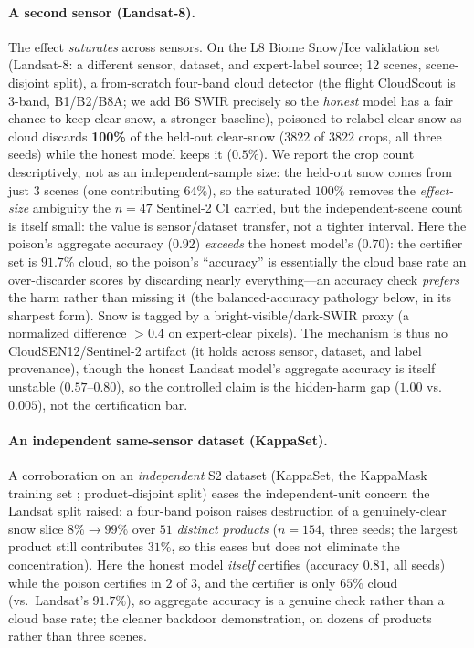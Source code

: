 \documentclass[conference]{IEEEtran}
\begin{document}
\paragraph{A second sensor (Landsat-8).} The effect \emph{saturates} across sensors. On the L8 Biome Snow/Ice validation set \cite{foga2017}
(Landsat-8: a different sensor, dataset, and expert-label source; 12 scenes, scene-disjoint split), a from-scratch
four-band cloud detector (the flight CloudScout is 3-band, B1/B2/B8A; we add B6 SWIR precisely so the
\emph{honest} model has a fair chance to keep clear-snow, a stronger baseline), poisoned to relabel clear-snow as
cloud discards \textbf{100\%} of the held-out clear-snow ($3822$ of $3822$ crops, all three seeds) while the honest
model keeps it ($0.5\%$). We report the crop count descriptively, not as an independent-sample size: the held-out
snow comes from just $3$ scenes (one contributing $64\%$), so the saturated $100\%$ removes the \emph{effect-size}
ambiguity the $n{=}47$ Sentinel-2 CI carried, but the independent-scene count is itself small: the value is
sensor/dataset transfer, not a tighter interval. Here the poison's aggregate accuracy ($0.92$) \emph{exceeds}
the honest model's ($0.70$): the certifier set is $91.7\%$ cloud, so the poison's ``accuracy'' is essentially the
cloud base rate an over-discarder scores by discarding nearly everything---an accuracy check \emph{prefers}
the harm rather than missing it (the balanced-accuracy pathology below, in its sharpest form). Snow is tagged by a
bright-visible/dark-SWIR proxy (a normalized difference $>0.4$ on expert-clear pixels). The mechanism is thus no
CloudSEN12/Sentinel-2 artifact (it holds across sensor, dataset, and label provenance), though the honest Landsat
model's aggregate accuracy is itself unstable ($0.57$--$0.80$), so the controlled claim is the hidden-harm gap
($1.00$ vs.\ $0.005$), not the certification bar.
\paragraph{An independent same-sensor dataset (KappaSet).} A corroboration on an \emph{independent} S2 dataset (KappaSet, the KappaMask training set
\cite{domnich2021,kappaset2022}; product-disjoint split) eases the independent-unit concern the Landsat split
raised: a four-band poison raises destruction of a genuinely-clear snow slice $8\%\!\to\!99\%$ over $51$
\emph{distinct products} ($n{=}154$, three seeds; the largest product still contributes $31\%$, so this eases
but does not eliminate the concentration). Here the honest model \emph{itself} certifies (accuracy $0.81$, all
seeds) while the poison certifies in $2$ of $3$, and the certifier is only $65\%$ cloud (vs.\ Landsat's
$91.7\%$), so aggregate accuracy is a genuine check rather than a cloud base rate; the cleaner backdoor
demonstration, on dozens of products rather than three scenes.
\end{document}
